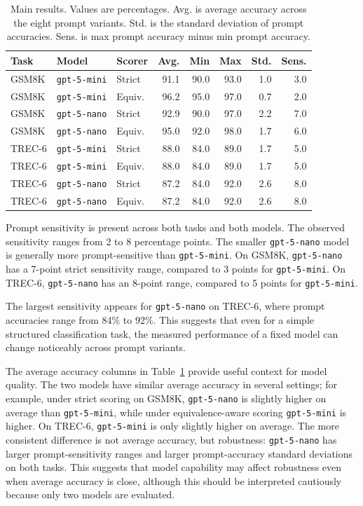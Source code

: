 \documentclass[11pt]{article}
\begin{document}
\begin{table}[t]
\centering
\small
\begin{tabular}{lllrrrrr}
\toprule
Task & Model & Scorer & Avg. & Min & Max & Std. & Sens. \\
\midrule
GSM8K & \texttt{gpt-5-mini} & Strict & 91.1 & 90.0 & 93.0 & 1.0 & 3.0 \\
GSM8K & \texttt{gpt-5-mini} & Equiv. & 96.2 & 95.0 & 97.0 & 0.7 & 2.0 \\
GSM8K & \texttt{gpt-5-nano} & Strict & 92.9 & 90.0 & 97.0 & 2.2 & 7.0 \\
GSM8K & \texttt{gpt-5-nano} & Equiv. & 95.0 & 92.0 & 98.0 & 1.7 & 6.0 \\
\midrule
TREC-6 & \texttt{gpt-5-mini} & Strict & 88.0 & 84.0 & 89.0 & 1.7 & 5.0 \\
TREC-6 & \texttt{gpt-5-mini} & Equiv. & 88.0 & 84.0 & 89.0 & 1.7 & 5.0 \\
TREC-6 & \texttt{gpt-5-nano} & Strict & 87.2 & 84.0 & 92.0 & 2.6 & 8.0 \\
TREC-6 & \texttt{gpt-5-nano} & Equiv. & 87.2 & 84.0 & 92.0 & 2.6 & 8.0 \\
\bottomrule
\end{tabular}
\caption{Main results. Values are percentages. Avg. is average accuracy across the eight prompt variants. Std. is the standard deviation of prompt accuracies. Sens. is max prompt accuracy minus min prompt accuracy.}
\label{tab:main-results}
\end{table}

Prompt sensitivity is present across both tasks and both models. The observed sensitivity ranges from 2 to 8 percentage points. The smaller \texttt{gpt-5-nano} model is generally more prompt-sensitive than \texttt{gpt-5-mini}. On GSM8K, \texttt{gpt-5-nano} has a 7-point strict sensitivity range, compared to 3 points for \texttt{gpt-5-mini}. On TREC-6, \texttt{gpt-5-nano} has an 8-point range, compared to 5 points for \texttt{gpt-5-mini}.

The largest sensitivity appears for \texttt{gpt-5-nano} on TREC-6, where prompt accuracies range from 84\% to 92\%. This suggests that even for a simple structured classification task, the measured performance of a fixed model can change noticeably across prompt variants.

The average accuracy columns in Table~\ref{tab:main-results} provide useful context for model quality. The two models have similar average accuracy in several settings; for example, under strict scoring on GSM8K, \texttt{gpt-5-nano} is slightly higher on average than \texttt{gpt-5-mini}, while under equivalence-aware scoring \texttt{gpt-5-mini} is higher. On TREC-6, \texttt{gpt-5-mini} is only slightly higher on average. The more consistent difference is not average accuracy, but robustness: \texttt{gpt-5-nano} has larger prompt-sensitivity ranges and larger prompt-accuracy standard deviations on both tasks. This suggests that model capability may affect robustness even when average accuracy is close, although this should be interpreted cautiously because only two models are evaluated.
\end{document}
